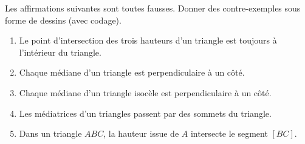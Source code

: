 
\begin{exercice}\label{exosmath-0932}

    Les affirmations suivantes sont toutes fausses. Donner des contre-exemples sous forme de dessins (avec codage).
    \begin{enumerate}
        \item
            Le point d'intersection des trois hauteurs d'un triangle est toujours à l'intérieur du triangle.
        \item
            Chaque médiane d'un triangle est perpendiculaire à un côté.
        \item
            Chaque médiane d'un triangle isocèle est perpendiculaire à un côté.
        \item
            Les médiatrices d'un triangles passent par des sommets du triangle.
        \item
            Dans un triangle \( ABC\), la hauteur issue de \( A\) intersecte le segment \( [BC]\).
    \end{enumerate}

\end{exercice}

